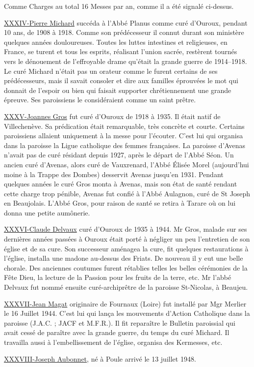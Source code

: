 \noindent Comme Charges au total 16 Messes par an, comme il a été signalé ci-dessus.

\underline{XXXIV-Pierre Michard} succéda à l'Abbé Planus comme curé d'Ouroux, pendant 10 ans, de 1908 à 1918. Comme son prédécesseur il connut durant son ministère quelques années douloureuses. Toutes les luttes intestines et religieuses, en France, se turent et tous les esprits, réalisant l'union sacrée, restèrent tournés vers le dénouement de
l'effroyable drame qu'était la grande guerre de 1914--1918. Le curé Michard n'était pas un orateur comme le furent certains de ses prédécesseurs, mais il savait consoler et dire aux familles éprouvées le mot qui donnait de l'espoir ou bien qui faisait supporter chrétiennement une grande épreuve. Ses paroissiens le considéraient comme un saint prêtre.

\underline{XXXV-Joannes Gros} fut curé d'Ouroux de 1918 à 1935. Il était natif de Villechenève. Sa prédication était remarquable, très concrète et courte. Certains paroissiens allaient uniquement à la messe pour l'écouter. C'est lui qui organisa dans la paroisse la Ligue catholique des femmes françaises. La paroisse d'Avenas n'avait pas de curé résidant depuis 1927, après le départ de l'Abbé Séon. Un ancien curé d'Avenas, alors curé de Vauxrenard, l'Abbé Élisée Morel (aujourd'hui moine à la Trappe des Dombes) desservit Avenas jusqu'en 1931. Pendant quelques années le curé Gros monta à Avenas, mais son état de santé rendant cette charge trop pénible, Avenas fut confié à l'Abbé Aulagnon, curé de St Joseph en Beaujolais. L'Abbé Gros, pour raison de santé se retira à Tarare où on lui donna une petite aumônerie.

\underline{XXXVI-Claude Delvaux} curé d'Ouroux de 1935 à 1944. Mr Gros, malade sur ses dernières années passées à Ouroux était porté à négliger un peu l'entretien de son église et de sa cure. Son successeur aménagea la cure, fit quelques restaurations à l'église, installa une madone au-dessus des Friats. De nouveau il y eut une belle chorale. Des anciennes coutumes furent rétablies telles les belles cérémonies de la Fête Dieu, la lecture de la Passion pour les fruits de la terre, etc. Mr l'abbé Delvaux fut nommé ensuite curé-archiprêtre de la paroisse St-Nicolas, à Beaujeu.

\underline{XXXVII-Jean Magat} originaire de Fournaux (Loire) fut installé par Mgr Merlier le 16 Juillet 1944. C'est lui qui lança les mouvements d'Action Catholique dans la paroisse (J.A.C. ; JACF et M.F.R.). Il fit reparaître le Bulletin paroissial qui avait cessé de paraître avec la grande guerre, du temps du curé Michard. Il travailla aussi à l'embellissement de l'église, organisa des Kermesses, etc.

\enlargethispage{2\baselineskip}
\underline{XXXVIII-Joseph Aubonnet}, né à Poule arrivé le 13 juillet 1948.
